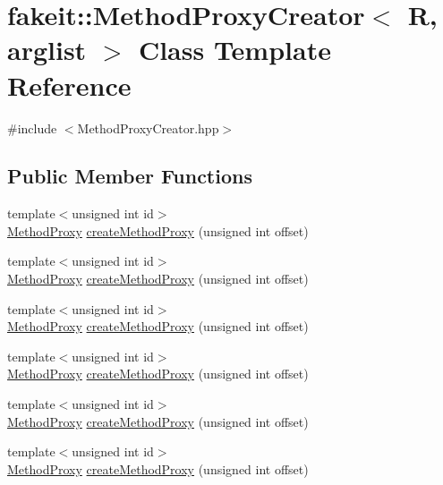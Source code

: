 \hypertarget{classfakeit_1_1MethodProxyCreator}{}\section{fakeit\+::Method\+Proxy\+Creator$<$ R, arglist $>$ Class Template Reference}
\label{classfakeit_1_1MethodProxyCreator}


{\ttfamily \#include $<$Method\+Proxy\+Creator.\+hpp$>$}

\subsection*{Public Member Functions}
\begin{DoxyCompactItemize}
\item 
{\footnotesize template$<$unsigned int id$>$ }\\\mbox{\hyperlink{structfakeit_1_1MethodProxy}{Method\+Proxy}} \mbox{\hyperlink{classfakeit_1_1MethodProxyCreator_abdfdb5f6152dbe98a2e72d2a30ea28dd}{create\+Method\+Proxy}} (unsigned int offset)
\item 
{\footnotesize template$<$unsigned int id$>$ }\\\mbox{\hyperlink{structfakeit_1_1MethodProxy}{Method\+Proxy}} \mbox{\hyperlink{classfakeit_1_1MethodProxyCreator_abdfdb5f6152dbe98a2e72d2a30ea28dd}{create\+Method\+Proxy}} (unsigned int offset)
\item 
{\footnotesize template$<$unsigned int id$>$ }\\\mbox{\hyperlink{structfakeit_1_1MethodProxy}{Method\+Proxy}} \mbox{\hyperlink{classfakeit_1_1MethodProxyCreator_abdfdb5f6152dbe98a2e72d2a30ea28dd}{create\+Method\+Proxy}} (unsigned int offset)
\item 
{\footnotesize template$<$unsigned int id$>$ }\\\mbox{\hyperlink{structfakeit_1_1MethodProxy}{Method\+Proxy}} \mbox{\hyperlink{classfakeit_1_1MethodProxyCreator_abdfdb5f6152dbe98a2e72d2a30ea28dd}{create\+Method\+Proxy}} (unsigned int offset)
\item 
{\footnotesize template$<$unsigned int id$>$ }\\\mbox{\hyperlink{structfakeit_1_1MethodProxy}{Method\+Proxy}} \mbox{\hyperlink{classfakeit_1_1MethodProxyCreator_abdfdb5f6152dbe98a2e72d2a30ea28dd}{create\+Method\+Proxy}} (unsigned int offset)
\item 
{\footnotesize template$<$unsigned int id$>$ }\\\mbox{\hyperlink{structfakeit_1_1MethodProxy}{Method\+Proxy}} \mbox{\hyperlink{classfakeit_1_1MethodProxyCreator_abdfdb5f6152dbe98a2e72d2a30ea28dd}{create\+Method\+Proxy}} (unsigned int offset)

\end{DoxyCompactItemize}
